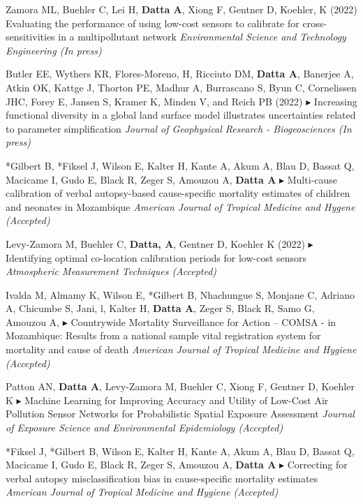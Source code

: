 \documentclass[12pt]{article}
\newcommand{\mine}{
  \addtocounter{enumi}{1}
\item[\fcolorbox{white}{grey}{\color{white} \tiny \arabic{enumi}}]
}
\newcommand{\dg}[1]{{\color{black} $\blacktriangleright$ {#1}}}
\begin{document}
\item Zamora ML, Buehler C, Lei H, \textbf{Datta A}, Xiong F, Gentner D, Koehler, K (2022) {Evaluating the performance of using low-cost sensors to calibrate for cross-sensitivities in a multipollutant network} {\it Environmental Science and Technology Engineering (In press)}

\item Butler EE, Wythers KR, Flores-Moreno, H, Ricciuto DM, \textbf{Datta A}, Banerjee A, Atkin OK, Kattge J, Thorton PE, Madhur A, Burrascano S, Byun C, Cornelissen JHC, Forey E, Jansen S, Kramer K, Minden V, and Reich PB (2022) {\dg Increasing functional diversity in a global land surface model illustrates uncertainties related to parameter simplification} {\it Journal of Geophysical Research - Biogeosciences (In press)}

\mine *Gilbert B, *Fiksel J, Wilson E, Kalter H, Kante A, Akum A, Blau D, Bassat Q, Macicame I, Gudo E, Black R, Zeger  S, Amouzou A, \textbf{Datta A} {\dg Multi-cause calibration of verbal autopsy-based cause-specific mortality estimates of children and neonates in Mozambique} {\it American Journal of Tropical Medicine and Hygene (Accepted)}

\item Levy-Zamora M, Buehler C, \textbf{Datta, A}, Gentner D, Koehler K (2022) {\dg Identifying optimal co-location calibration periods for low-cost sensors} {\it Atmospheric Measurement Techniques (Accepted)}

\item Ivalda M, Almamy K, Wilson E, *Gilbert B, Nhachungue S, Monjane C, Adriano A, Chicumbe S, Jani, l, Kalter H, \textbf{Datta A}, Zeger S, Black R, Samo G, Amouzou A, {\dg Countrywide Mortality Surveillance for Action – COMSA - in Mozambique: Results from a national sample vital registration system for mortality and cause of death} {\it American Journal of Tropical Medicine and Hygiene (Accepted)}

\item Patton AN, \textbf{Datta A}, Levy-Zamora M, Buehler C, Xiong F, Gentner D, Koehler K {\dg Machine Learning for Improving Accuracy and Utility of Low-Cost Air Pollution Sensor Networks for Probabilistic Spatial Exposure Assessment} {\it Journal of Exposure Science and Environmental Epidemiology (Accepted)}

\mine *Fiksel J, *Gilbert B, Wilson E, Kalter H, Kante A, Akum A, Blau D, Bassat Q, Macicame I, Gudo E, Black R, Zeger  S, Amouzou A, \textbf{Datta A}  {\dg Correcting for verbal autopsy misclassification bias in cause-specific mortality estimates} {\it American Journal of Tropical Medicine and Hygiene (Accepted)}
\end{document}
